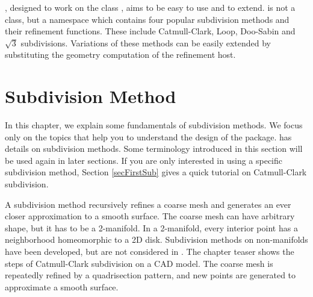 
, designed to work on the class 
, aims to be easy to use and to extend.
 is not a class, but a namespace 
which contains four popular subdivision methods and their refinement
functions. These include Catmull-Clark, Loop, Doo-Sabin and 
$\sqrt{3}$ subdivisions. Variations of these methods can be easily 
extended by substituting the geometry computation of the refinement
host.

\section{Subdivision Method}
\label{secSubAlgo}
In this chapter, we explain some fundamentals of 
subdivision methods. We focus only on the topics that help you 
to understand the design of the package. \cite{cgal:ww-smgd-02} 
has details on subdivision methods.
Some terminology introduced in this section will be used again
in later sections. If you are only interested in using a 
specific subdivision method, Section \ref{secFirstSub} 
gives a quick tutorial on Catmull-Clark subdivision.

A subdivision method recursively refines a coarse mesh and 
generates an ever closer approximation to a smooth surface.
The coarse mesh can have arbitrary shape, but it has to 
be a 2-manifold. In a 2-manifold, every interior point has 
a neighborhood homeomorphic to a 2D disk. Subdivision methods
on non-manifolds have been developed, but are not considered
in . 
The chapter teaser shows the steps of Catmull-Clark 
subdivision on a CAD model. The coarse mesh is repeatedly refined 
by a quadrisection pattern, and new points are generated 
to approximate a smooth surface.

